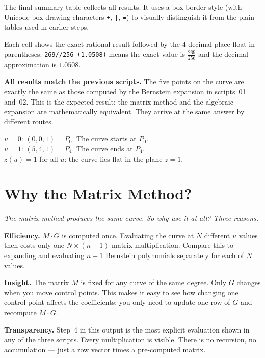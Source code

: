 \documentclass[12pt, a4paper]{article}
\newcommand{\cd}[1]{\texttt{#1}}
\begin{document}
The final summary table collects all results.
It uses a box-border style (with Unicode box-drawing characters
\cd{+}, \cd{|}, \cd{=}) to visually distinguish
it from the plain tables used in earlier steps.

Each cell shows the exact rational result followed by the
4-decimal-place float in parentheses:
\cd{269//256~(1.0508)} means the exact value is $\tfrac{269}{256}$
and the decimal approximation is $1.0508$.

\begin{notebox}
\textbf{All results match the previous scripts.}
The five points on the curve are exactly the same as those
computed by the Bernstein expansion in scripts~01 and~02.
This is the expected result: the matrix method and the
algebraic expansion are mathematically equivalent.
They arrive at the same answer by different routes.

$u=0$: $(0, 0, 1) = P_0$. The curve starts at $P_0$. \\
$u=1$: $(5, 4, 1) = P_4$. The curve ends at $P_4$. \\
$z(u) = 1$ for all $u$: the curve lies flat in the plane $z=1$.
\end{notebox}


\section{Why the Matrix Method?}

\textit{The matrix method produces the same curve.
So why use it at all?
Three reasons.}

\textbf{Efficiency.}
$M \cdot G$ is computed once.
Evaluating the curve at $N$ different $u$ values then
costs only one $N \times (n+1)$ matrix multiplication.
Compare this to expanding and evaluating $n+1$ Bernstein
polynomials separately for each of $N$ values.

\textbf{Insight.}
The matrix $M$ is fixed for any curve of the same degree.
Only $G$ changes when you move control points.
This makes it easy to see how changing one control point
affects the coefficients: you only need to update
one row of $G$ and recompute $M \cdot G$.

\textbf{Transparency.}
Step~4 in this output is the most explicit evaluation
shown in any of the three scripts.
Every multiplication is visible.
There is no recursion, no accumulation ---
just a row vector times a pre-computed matrix.
\end{document}
